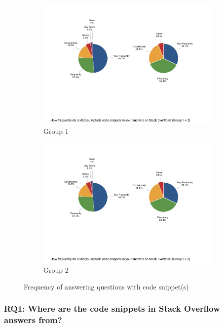 \documentclass{svjour3}                     %
\begin{document}
\begin{figure}
	\begin{subfigure}{.5\textwidth}
		\centering
		\includegraphics[width=\linewidth]{survey_answer_frequency_with_code_1}
		\caption{Group 1}
		\label{fig:survey_answer_frequency_with_code_1}
	\end{subfigure}%
	\begin{subfigure}{.5\textwidth}
		\centering
		\includegraphics[width=0.9\linewidth]{survey_answer_frequency_with_code_2}
		\caption{Group 2}
		\label{fig:survey_answer_frequency_with_code_2}
	\end{subfigure}
	\caption{Frequency of answering questions with code snippet(s)}
	\label{fig:survey_answer_frequency_with_code}
\end{figure}

\subsubsection*{RQ1: Where are the code snippets in Stack Overflow answers from?} 
\end{document}
